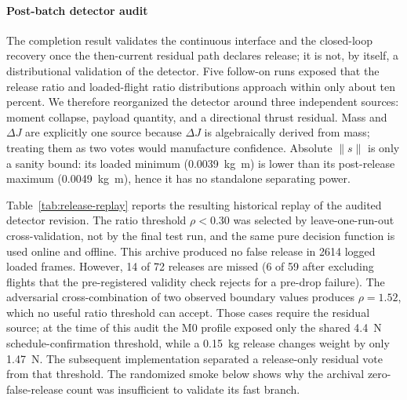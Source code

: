 \paragraph{Post-batch detector audit} The completion result validates the continuous interface and
the closed-loop recovery once the then-current residual path declares release; it is not, by
itself, a distributional validation of the detector. Five follow-on runs exposed that the
release ratio and loaded-flight ratio distributions approach within only about ten percent.
We therefore reorganized the detector around three independent sources: moment collapse,
payload quantity, and a directional thrust residual. Mass and $\Delta J$ are explicitly one
source because $\Delta J$ is algebraically derived from mass; treating them as two votes would
manufacture confidence. Absolute $\lVert s\rVert$ is only a sanity bound: its loaded minimum
(\SI{0.0039}{\kilo\gram\metre}) is lower than its post-release maximum
(\SI{0.0049}{\kilo\gram\metre}), hence it has no standalone separating power.

Table~\ref{tab:release-replay} reports the resulting historical replay of the audited detector
revision. The ratio threshold
$\rho<0.30$ was selected by leave-one-run-out cross-validation, not by the final test run, and
the same pure decision function is used online and offline. This archive produced no false
release in 2614 logged loaded frames. However, 14 of 72 releases are missed (6
of 59 after excluding flights that the pre-registered validity check rejects for a
pre-drop failure). The adversarial cross-combination of two
observed boundary values produces $\rho=1.52$, which no useful ratio threshold can accept.
Those cases require the residual source; at the time of this audit the M0 profile exposed only
the shared \SI{4.4}{N} schedule-confirmation threshold, while a \SI{0.15}{kg} release changes
weight by only \SI{1.47}{N}. The subsequent implementation separated a release-only residual
vote from that threshold. The randomized smoke below shows why the archival zero-false-release
count was insufficient to validate its fast branch.

